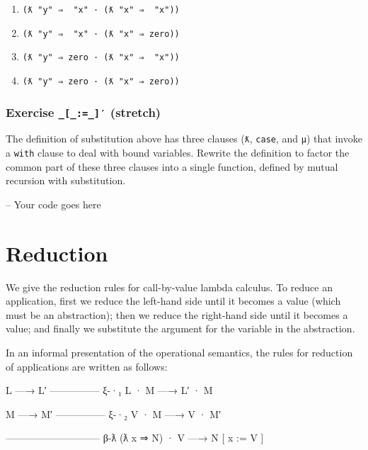 \begin{enumerate}
\def\labelenumi{\arabic{enumi}.}
\tightlist
\item
  \texttt{(ƛ\ "y"\ ⇒\ \textasciigrave{}\ "x"\ ·\ (ƛ\ "x"\ ⇒\ \textasciigrave{}\ "x"))}
\item
  \texttt{(ƛ\ "y"\ ⇒\ \textasciigrave{}\ "x"\ ·\ (ƛ\ "x"\ ⇒\ \textasciigrave{}zero))}
\item
  \texttt{(ƛ\ "y"\ ⇒\ \textasciigrave{}zero\ ·\ (ƛ\ "x"\ ⇒\ \textasciigrave{}\ "x"))}
\item
  \texttt{(ƛ\ "y"\ ⇒\ \textasciigrave{}zero\ ·\ (ƛ\ "x"\ ⇒\ \textasciigrave{}zero))}
\end{enumerate}

\hypertarget{exercise-___-stretch}{%
\subsubsection{\texorpdfstring{Exercise \texttt{\_{[}\_:=\_{]}′}
(stretch)}{Exercise \_{[}\_:=\_{]}′ (stretch)}}\label{exercise-___-stretch}}

The definition of substitution above has three clauses (\texttt{ƛ},
\texttt{case}, and \texttt{μ}) that invoke a \texttt{with} clause to
deal with bound variables. Rewrite the definition to factor the common
part of these three clauses into a single function, defined by mutual
recursion with substitution.

\begin{fence}
\begin{code}
-- Your code goes here
\end{code}
\end{fence}

\hypertarget{reduction}{%
\section{Reduction}\label{reduction}}

We give the reduction rules for call-by-value lambda calculus. To reduce
an application, first we reduce the left-hand side until it becomes a
value (which must be an abstraction); then we reduce the right-hand side
until it becomes a value; and finally we substitute the argument for the
variable in the abstraction.

In an informal presentation of the operational semantics, the rules for
reduction of applications are written as follows:

\begin{myDisplay}
L —→ L′
--------------- ξ-·₁
L · M —→ L′ · M

M —→ M′
--------------- ξ-·₂
V · M —→ V · M′

----------------------------- β-ƛ
(ƛ x ⇒ N) · V —→ N [ x := V ]
\end{myDisplay}

